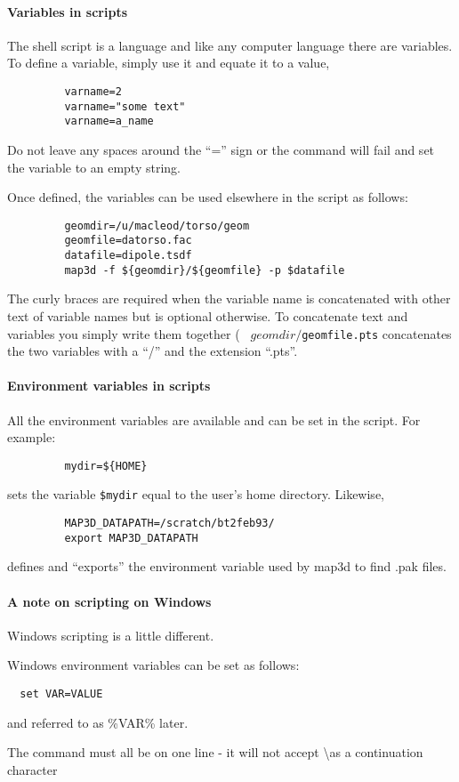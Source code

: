 \paragraph{Variables in scripts }  The shell script is a language and like
any computer language there are variables.  To define a variable, simply
use it and equate it to a value, \eg{}
\begin{verbatim}
         varname=2
         varname="some text"
         varname=a_name
\end{verbatim}

Do not leave any spaces around the ``='' sign or the command will fail and
set the variable to an empty string.

Once defined, the variables can be used elsewhere in the script as follows:
\begin{verbatim}
         geomdir=/u/macleod/torso/geom
         geomfile=datorso.fac
         datafile=dipole.tsdf
         map3d -f ${geomdir}/${geomfile} -p $datafile
\end{verbatim}

The curly braces are required when the variable name is concatenated with
other text of variable names but is optional otherwise.  To concatenate
text and variables you simply write them together (\eg{} {\tt
${geomdir}/${geomfile}.pts} concatenates the two variables with a ``/'' and
the extension ``.pts''.

\paragraph{Environment variables in scripts}

All the environment variables are available and can be set in the script.
For example:
\begin{verbatim}
         mydir=${HOME}
\end{verbatim}
sets the variable {\tt \$mydir} equal to the user's home directory.
Likewise,
\begin{verbatim}
         MAP3D_DATAPATH=/scratch/bt2feb93/
         export MAP3D_DATAPATH
\end{verbatim}
defines and ``exports'' the environment variable used by map3d to find
.pak files. 

\paragraph{A note on scripting on Windows}
Windows scripting is a little different.
\begin{description}
  \item Windows environment variables can be set as follows:
  \begin{verbatim}
  set VAR=VALUE
  \end{verbatim}
  and referred to as \%VAR\% later.
  \item The \map{} command must all be on one line - it will not accept \textbackslash  as a continuation character
\end{description}

% 



